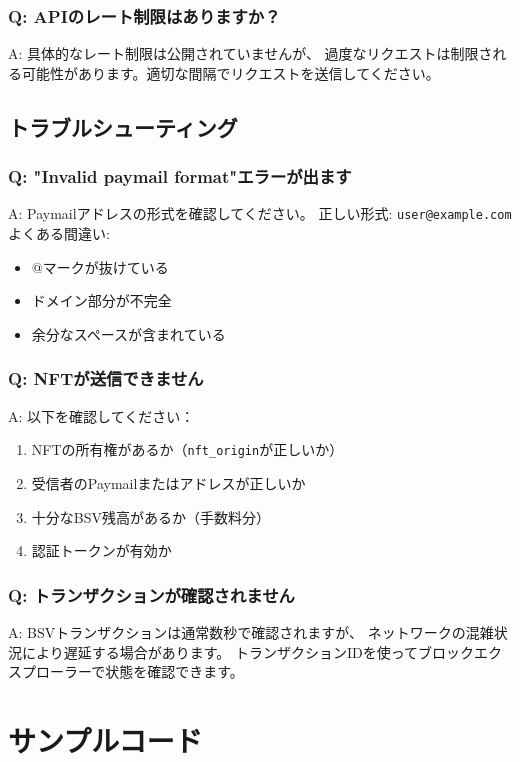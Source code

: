 \documentclass[11pt,a4paper]{ltjsarticle}  %
\begin{document}
\subsubsection{Q: APIのレート制限はありますか？}
A: 具体的なレート制限は公開されていませんが、
過度なリクエストは制限される可能性があります。適切な間隔でリクエストを送信してください。

\subsection{トラブルシューティング}

\subsubsection{Q: "Invalid paymail format"エラーが出ます}
A: Paymailアドレスの形式を確認してください。
正しい形式: \texttt{user@example.com}
よくある間違い:
\begin{itemize}
    \item @マークが抜けている
    \item ドメイン部分が不完全
    \item 余分なスペースが含まれている
\end{itemize}

\subsubsection{Q: NFTが送信できません}
A: 以下を確認してください：
\begin{enumerate}
    \item NFTの所有権があるか（\texttt{nft\_origin}が正しいか）
    \item 受信者のPaymailまたはアドレスが正しいか
    \item 十分なBSV残高があるか（手数料分）
    \item 認証トークンが有効か
\end{enumerate}

\subsubsection{Q: トランザクションが確認されません}
A: BSVトランザクションは通常数秒で確認されますが、
ネットワークの混雑状況により遅延する場合があります。
トランザクションIDを使ってブロックエクスプローラーで状態を確認できます。

\section{サンプルコード}
\end{document}

